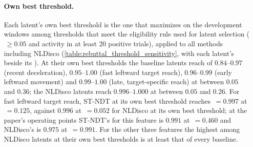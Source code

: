 \paragraph{Own best threshold.} Each latent's own best threshold is the one that maximizes  on the development windows among thresholds that meet the eligibility rule used for latent selection ($\,\geq0.05$ and activity in at least 20 positive trials), applied to all methods including NLDisco (\autoref{table:rebuttal_threshold_sensitivity}, with each latent's  beside its ). At their own best thresholds the baseline latents reach  of $0.84$--$0.97$ (recent deceleration), $0.95$--$1.00$ (fast leftward target reach), $0.96$--$0.99$ (early leftward movement) and $0.99$--$1.00$ (late, target-specific reach) at  between $0.05$ and $0.36$; the NLDisco latents reach $0.996$--$1.000$ at  between $0.05$ and $0.26$. For fast leftward target reach, ST-NDT at its own best threshold reaches $\,=0.997$ at $\,=0.125$, against $0.996$ at $\,=0.052$ for NLDisco at its own best threshold; at the paper's operating points ST-NDT's  for this feature is $0.991$ at $\,=0.460$ and NLDisco's is $0.975$ at $\,=0.991$. For the other three features the highest  among NLDisco latents at their own best thresholds is at least that of every baseline.

\begin{table}[!htbp]
    \centering
    {\scriptsize\setlength{\tabcolsep}{2.5pt}\renewcommand{\arraystretch}{1.08}
    \resizebox{\linewidth}{!}{}}
    \caption{\textbf{Scores at named activation-rate settings.} Development windows; latents as in \autoref{table:churchland_feature_metrics} and, for ST-NDT, as selected by the same rule. For the dense baselines, $r/2$, $r$ and $2r$ are multiples of the paper's rate; for NLDisco, $r$ is the native threshold $z>0$, half of its native rate is shown, and twice that rate is not reachable (--). Own best: the threshold with the highest  subject to $\metric{Cov}\geq0.05$ and activity in at least 20 positive trials; the last column gives the resulting activation rate.  does not depend on the threshold. For recent deceleration, the NLDisco paper-rate and  entries are from Table~\ref{table:churchland_comparison}; other entries are re-scored.}
    \label{table:rebuttal_threshold_sensitivity}
\end{table}
